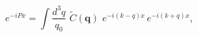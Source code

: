 \begin{equation}
e^{-iPx} = \int \frac{d^3q}{q_0}\, \, \tilde{C}({\mathbf{q}}) 
\,\, e^{-i(k-q)x} \, e^{-i(k+q)x} ,  \label{3-7}
\end{equation}

